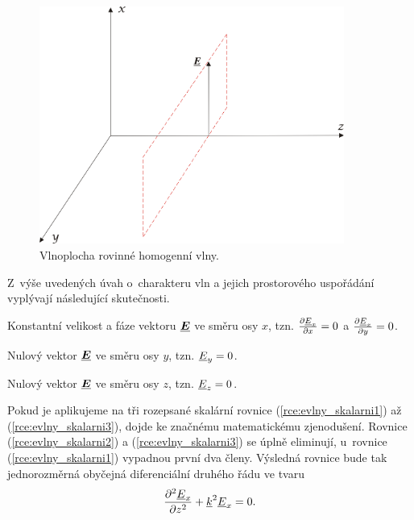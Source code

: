 \begin{figure}[!h]
	\centering
	\includegraphics[width=10cm]{evlny_vlnoplocha.png}
	\caption{Vlnoplocha rovinné homogenní vlny. \cite{emp}}
	\label{obr:evlny_vlnoplocha}
\end{figure}

Z~výše uvedených úvah o~charakteru vln a jejich prostorového uspořádání vyplývají následující skutečnosti.
\begin{itemize*}
\item Konstantní velikost a fáze vektoru $\mbox{\underline{\boldmath$E$}}$ ve směru osy $x$, tzn. $\frac{\partial  {\underline{E}}_{x}}{\partial x}=0$ a $\frac{\partial {\underline{E}}_{x}}{\partial y}=0$.
\item Nulový vektor $\mbox{\underline{\boldmath$E$}}$ ve směru osy $y$, tzn. $ {\underline{E}}_{y} = 0$.
\item Nulový vektor $\mbox{\underline{\boldmath$E$}}$ ve směru osy $z$, tzn. $ {\underline{E}}_{z} = 0$.
\end{itemize*}
Pokud je aplikujeme na tři rozepsané skalární rovnice (\ref{rce:evlny_skalarni1}) až (\ref{rce:evlny_skalarni3}), dojde ke značnému matematickému zjenodušení. Rovnice (\ref{rce:evlny_skalarni2}) a (\ref{rce:evlny_skalarni3}) se úplně eliminují, u~rovnice (\ref{rce:evlny_skalarni1}) vypadnou první dva členy. Výsledná rovnice bude tak jednorozměrná obyčejná diferenciální druhého řádu ve tvaru
\begin{equation}
	\frac{\partial ^{2} {\underline{E}}_{x}}{\partial z^{2}} + {\underline{k}}^{2} {\underline{E}}_{x} = 0.
	\label{rce:evlny_skalarni}	
\end{equation}

